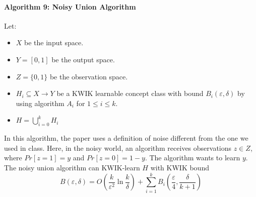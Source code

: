 \paragraph{Algorithm 9: Noisy Union Algorithm}
Let:
\begin{itemize}
  \item $X$ be the input space.
  \item $Y = [0, 1]$ be the output space.
  \item $Z = \{0, 1\}$ be the observation space.
  \item $H_i \subseteq X \to Y$ be a KWIK learnable concept class with bound
  $B_i(\varepsilon, \delta)$ by using algorithm $A_i$ for $1 \leq i \leq k$.
  \item $H = \bigcup_{i=0}^k H_i$
\end{itemize}

In this algorithm, the paper uses a definition of noise different from the one
we used in class. Here, in the noisy world, an algorithm receives observations
$z \in Z$, where $Pr[z = 1] = y$ and $Pr[z = 0] = 1 - y$. The algorithm wants
to learn $y$. \\

The noisy union algorithm can KWIK-learn $H$ with KWIK bound
$$B(\varepsilon, \delta) = O\left( \frac{k}{\varepsilon^2} \ln \frac{k}{\delta}
\right) + \sum_{i=1}^k B_i \left( \frac{\varepsilon}{4}, \frac{\delta}{k + 1}
\right)$$

